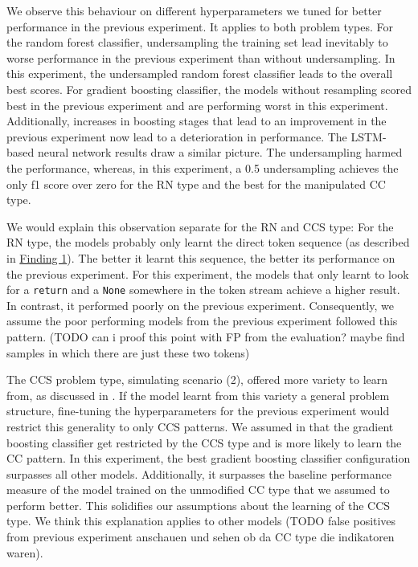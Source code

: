 We observe this behaviour on different hyperparameters we tuned for better performance in the previous experiment. It applies to both problem types.
For the random forest classifier, undersampling the training set lead inevitably to worse performance in the previous experiment than without undersampling. In this experiment, the undersampled random forest classifier leads to the overall best scores. For gradient boosting classifier, the models without resampling scored best in the previous experiment and are performing worst in this experiment. Additionally, increases in boosting stages that lead to an improvement in the previous experiment now lead to a deterioration in performance. 
The LSTM-based neural network results draw a similar picture. The undersampling harmed the performance, whereas, in this experiment, a 0.5 undersampling achieves the only f1 score over zero for the RN type and the best for the manipulated CC type.

We would explain this observation separate for the RN and CCS type:
For the RN type, the models probably only learnt the direct token sequence (as described in \hyperref[finding:return_none_manipulated_bad]{Finding 1}). The better it learnt this sequence, the better its performance on the previous experiment. For this experiment, the models that only learnt to look for a \texttt{return} and a \texttt{None} somewhere in the token stream achieve a higher result. In contrast, it performed poorly on the previous experiment. Consequently, we assume the poor performing models from the previous experiment followed this pattern. (TODO can i proof this point with FP from the evaluation? maybe find samples in which there are just these two tokens)

The CCS problem type, simulating scenario (2), offered more variety to learn from, as discussed in . If the model learnt from this variety a general problem structure, fine-tuning the hyperparameters for the previous experiment would restrict this generality to only CCS patterns. We assumed in  that the gradient boosting classifier get restricted by the CCS type and is more likely to learn the CC pattern. In this experiment, the best gradient boosting classifier configuration surpasses all other models. Additionally, it surpasses the baseline performance measure of the model trained on the unmodified CC type that we assumed to perform better. This solidifies our assumptions about the learning of the CCS type. We think this explanation applies to other models (TODO false positives from previous experiment anschauen und sehen ob da CC type die indikatoren waren).

